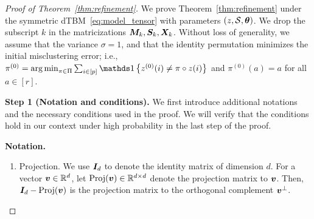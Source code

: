 \documentclass[lettersize,onecolumn,journal]{IEEEtran}
\theoremstyle{definition}
\theoremstyle{definition}
\newcommand{\offf}[1]{\left\{#1\right\}}
\begin{document}
\begin{proof}[Proof of Theorem~\ref{thm:refinement}]
We prove Theorem~\ref{thm:refinement} under the symmetric dTBM~\eqref{eq:model_tensor} with parameters $(z, \mathcal{S}, \boldsymbol{\theta})$. We drop the subscript $k$ in the matricizations $\bm M_k, \bm S_k, \bm X_k$. Without loss of generality, we assume that the variance $\sigma = 1$, and that the identity permutation minimizes the initial misclustering error; i.e., $\pi^{(0)} = \argmin_{\pi \in \Pi} \sum_{i \in [p]}\ind \offf{z^{(0)}(i) \neq \pi \circ z(i) }$ and $\pi^{(0)}(a) = a$ for all $ a \in [r]$.

{\bf Step 1 (Notation and conditions).} We first introduce additional notations and the necessary conditions used in the proof. We will verify that the conditions hold in our context under high probability in the last step of the proof. 

\textbf{Notation.}
\begin{enumerate}[wide]

\item Projection. We use $\bm I_d$ to denote the identity matrix of dimension $d$. For a vector $\bm{v} \in \mathbb{R}^d$, let $\text{Proj}(\bm{v}) \in \mathbb{R}^{d \times d}$ denote the projection matrix to $\bm{v}$. Then, $\bm I_d - \text{Proj}(\bm{v})$ is the projection matrix to the orthogonal complement $\bm{v}^{\perp}$. 


\end{enumerate}
\end{proof}
\end{document}
